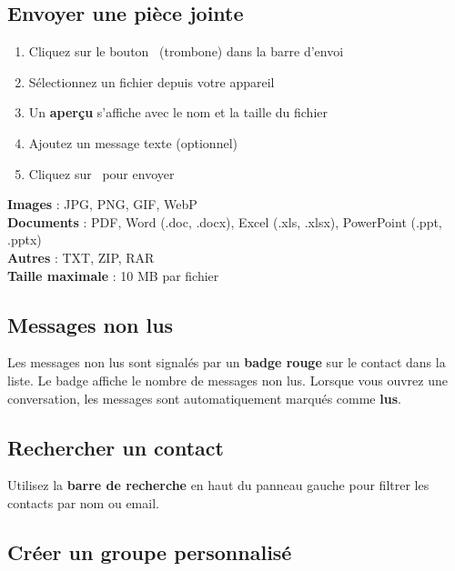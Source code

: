 \documentclass[12pt,a4paper]{article}
\begin{document}
\subsection{Envoyer une pièce jointe}

\begin{etapebox}
\begin{enumerate}[leftmargin=1.5em]
    \item Cliquez sur le bouton \faPaperclip\ (trombone) dans la barre d'envoi
    \item Sélectionnez un fichier depuis votre appareil
    \item Un \textbf{aperçu} s'affiche avec le nom et la taille du fichier
    \item Ajoutez un message texte (optionnel)
    \item Cliquez sur \faPaperPlane\ pour envoyer
\end{enumerate}
\end{etapebox}

\begin{infobox}
\textbf{Images} : JPG, PNG, GIF, WebP\\
\textbf{Documents} : PDF, Word (.doc, .docx), Excel (.xls, .xlsx), PowerPoint (.ppt, .pptx)\\
\textbf{Autres} : TXT, ZIP, RAR\\
\textbf{Taille maximale} : 10 MB par fichier
\end{infobox}

\subsection{Messages non lus}

Les messages non lus sont signalés par un \textbf{badge rouge} sur le contact dans la liste. Le badge affiche le nombre de messages non lus. Lorsque vous ouvrez une conversation, les messages sont automatiquement marqués comme \textbf{lus}.

\subsection{Rechercher un contact}

Utilisez la \textbf{barre de recherche} en haut du panneau gauche pour filtrer les contacts par nom ou email.

\subsection{Créer un groupe personnalisé}
\end{document}
